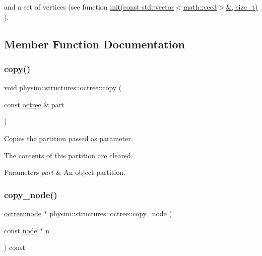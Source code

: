 and a set of vertices (see function \hyperlink{classphysim_1_1structures_1_1octree_a6b6f4eb568f298f92f2c25025c60a2e2}{init(const std\+::vector$<$math\+::vec3$>$\&, size\+\_\+t)} ). 

\subsection{Member Function Documentation}
\mbox{\label{classphysim_1_1structures_1_1octree_aefdcd3e41277fa5d639dc9452361cba5}} 
\subsubsection{\texorpdfstring{copy()}{copy()}}
{\footnotesize\ttfamily void physim\+::structures\+::octree\+::copy (\begin{DoxyParamCaption}\item[{const \hyperlink{classphysim_1_1structures_1_1octree}{octree} \&}]{part }\end{DoxyParamCaption})}



Copies the partition passed as parameter. 

The contents of this partition are cleared. 
\begin{DoxyParams}{Parameters}
{\em part} & An object partition. \\
\hline
\end{DoxyParams}
\mbox{\label{classphysim_1_1structures_1_1octree_a2c4f254c7dfac0ed6f0ee4197e1bdeac}} 
\subsubsection{\texorpdfstring{copy\+\_\+node()}{copy\_node()}}
{\footnotesize\ttfamily \hyperlink{structphysim_1_1structures_1_1octree_1_1node}{octree\+::node} $\ast$ physim\+::structures\+::octree\+::copy\+\_\+node (\begin{DoxyParamCaption}\item[{const \hyperlink{structphysim_1_1structures_1_1octree_1_1node}{node} $\ast$}]{n }\end{DoxyParamCaption}) const\hspace{0.3cm}{\ttfamily [private]}}



